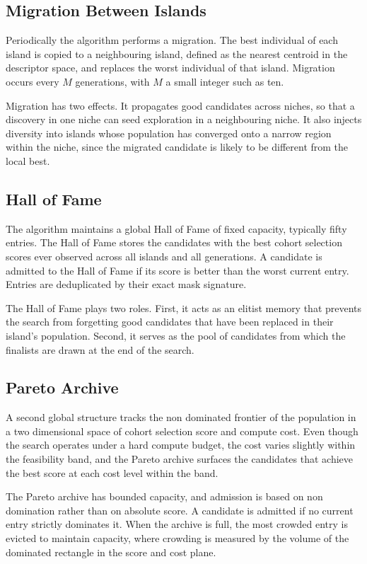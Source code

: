 \subsection{Migration Between Islands}

Periodically the algorithm performs a migration. The best individual of each island is copied to a neighbouring island, defined as the nearest centroid in the descriptor space, and replaces the worst individual of that island. Migration occurs every $M$ generations, with $M$ a small integer such as ten.

Migration has two effects. It propagates good candidates across niches, so that a discovery in one niche can seed exploration in a neighbouring niche. It also injects diversity into islands whose population has converged onto a narrow region within the niche, since the migrated candidate is likely to be different from the local best.

\subsection{Hall of Fame}

The algorithm maintains a global Hall of Fame of fixed capacity, typically fifty entries. The Hall of Fame stores the candidates with the best cohort selection scores ever observed across all islands and all generations. A candidate is admitted to the Hall of Fame if its score is better than the worst current entry. Entries are deduplicated by their exact mask signature.

The Hall of Fame plays two roles. First, it acts as an elitist memory that prevents the search from forgetting good candidates that have been replaced in their island's population. Second, it serves as the pool of candidates from which the finalists are drawn at the end of the search.

\subsection{Pareto Archive}

A second global structure tracks the non dominated frontier of the population in a two dimensional space of cohort selection score and compute cost. Even though the search operates under a hard compute budget, the cost varies slightly within the feasibility band, and the Pareto archive surfaces the candidates that achieve the best score at each cost level within the band.

The Pareto archive has bounded capacity, and admission is based on non domination rather than on absolute score. A candidate is admitted if no current entry strictly dominates it. When the archive is full, the most crowded entry is evicted to maintain capacity, where crowding is measured by the volume of the dominated rectangle in the score and cost plane.


